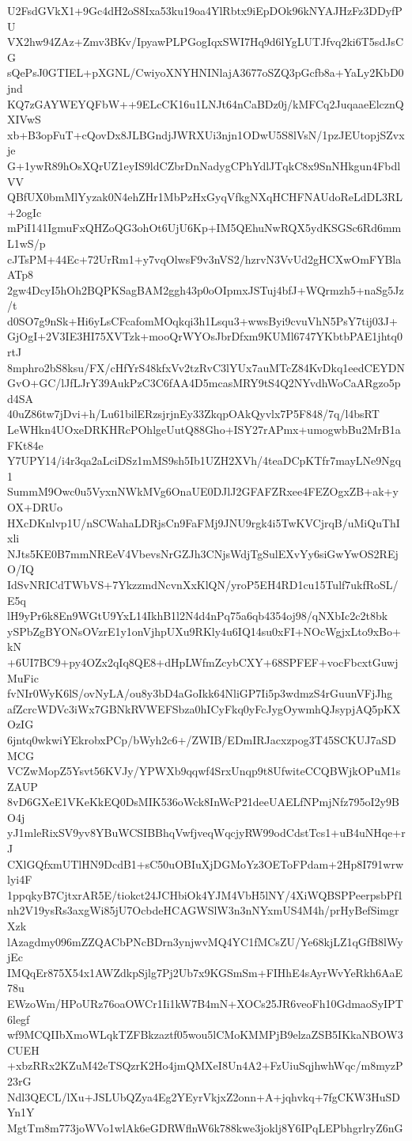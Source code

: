 U2FsdGVkX1+9Gc4dH2oS8Ixa53ku19oa4YlRbtx9iEpDOk96kNYAJHzFz3DDyfPU
VX2hw94ZAz+Zmv3BKv/IpyawPLPGogIqxSWI7Hq9d6lYgLUTJfvq2ki6T5sdJsCG
sQePsJ0GTIEL+pXGNL/CwiyoXNYHNINlajA3677oSZQ3pGcfb8a+YaLy2KbD0jnd
KQ7zGAYWEYQFbW++9ELcCK16u1LNJt64nCaBDz0j/kMFCq2JuqaaeElcznQXIVwS
xb+B3opFuT+cQovDx8JLBGndjJWRXUi3njn1ODwU5S8lVsN/1pzJEUtopjSZvxje
G+1ywR89hOsXQrUZ1eyIS9ldCZbrDnNadygCPhYdlJTqkC8x9SnNHkgun4FbdlVV
QBfUX0bmMlYyzak0N4ehZHr1MbPzHxGyqVfkgNXqHCHFNAUdoReLdDL3RL+2ogIc
mPiI141IgmuFxQHZoQG3ohOt6UjU6Kp+IM5QEhuNwRQX5ydKSGSc6Rd6mmL1wS/p
cJTsPM+44Ec+72UrRm1+y7vqOlwsF9v3nVS2/hzrvN3VvUd2gHCXwOmFYBlaATp8
2gw4DcyI5hOh2BQPKSagBAM2ggh43p0oOIpmxJSTuj4bfJ+WQrmzh5+naSg5Jz/t
d0SO7g9nSk+Hi6yLsCFcafomMOqkqi3h1Lsqu3+wwsByi9cvuVhN5PsY7tij03J+
GjOgI+2V3IE3HI75XVTzk+mooQrWYOsJbrDfxm9KUMl6747YKbtbPAE1jhtq0rtJ
8mphro2bS8ksu/FX/cHfYrS48kfxVv2tzRvC3lYUx7auMTcZ84KvDkq1eedCEYDN
GvO+GC/lJfLJrY39AukPzC3C6fAA4D5mcasMRY9tS4Q2NYvdhWoCaARgzo5pd4SA
40uZ86tw7jDvi+h/Lu61bilERzsjrjnEy33ZkqpOAkQyvlx7P5F848/7q/l4bsRT
LeWHkn4UOxeDRKHRcPOhlgeUutQ88Gho+ISY27rAPmx+umogwbBu2MrB1aFKt84e
Y7UPY14/i4r3qa2aLciDSz1mMS9sh5Ib1UZH2XVh/4teaDCpKTfr7mayLNe9Ngq1
SummM9Owc0u5VyxnNWkMVg6OnaUE0DJlJ2GFAFZRxee4FEZOgxZB+ak+yOX+DRUo
HXcDKnlvp1U/nSCWahaLDRjsCn9FaFMj9JNU9rgk4i5TwKVCjrqB/uMiQuThIxli
NJts5KE0B7mmNREeV4VbevsNrGZJh3CNjsWdjTgSulEXvYy6siGwYwOS2REjO/IQ
IdSvNRICdTWbVS+7YkzzmdNcvnXxKlQN/yroP5EH4RD1cu15Tulf7ukfRoSL/E5q
lH9yPr6k8En9WGtU9YxL14IkhB1l2N4d4nPq75a6qb4354oj98/qNXbIc2c2t8bk
ySPbZgBYONsOVzrE1y1onVjhpUXu9RKly4u6IQ14su0xFI+NOcWgjxLto9xBo+kN
+6UI7BC9+py4OZx2qIq8QE8+dHpLWfmZcybCXY+68SPFEF+vocFbcxtGuwjMuFic
fvNIr0WyK6lS/ovNyLA/ou8y3bD4aGoIkk64NliGP7Ii5p3wdmzS4rGuunVFjJhg
afZcrcWDVc3iWx7GBNkRVWEFSbza0hICyFkq0yFcJygOywmhQJsypjAQ5pKXOzIG
6jntq0wkwiYEkrobxPCp/bWyh2c6+/ZWIB/EDmIRJacxzpog3T45SCKUJ7aSDMCG
VCZwMopZ5Ysvt56KVJy/YPWXb9qqwf4SrxUnqp9t8UfwiteCCQBWjkOPuM1sZAUP
8vD6GXeE1VKeKkEQ0DsMIK536oWck8InWcP21deeUAELfNPmjNfz795oI2y9BO4j
yJ1mleRixSV9yv8YBuWCSIBBhqVwfjveqWqcjyRW99odCdstTcs1+uB4uNHqe+rJ
CXlGQfxmUTlHN9DcdB1+sC50uOBIuXjDGMoYz3OEToFPdam+2Hp8I791wrwlyi4F
1ppqkyB7CjtxrAR5E/tiokct24JCHbiOk4YJM4VbH5lNY/4XiWQBSPPeerpsbPf1
nh2V19ysRs3axgWi85jU7OcbdeHCAGWSlW3n3nNYxmUS4M4h/prHyBefSimgrXzk
lAzagdmy096mZZQACbPNcBDrn3ynjwvMQ4YC1fMCsZU/Ye68kjLZ1qGfB8lWyjEc
IMQqEr875X54x1AWZdkpSjlg7Pj2Ub7x9KGSmSm+FIHhE4sAyrWvYeRkh6AaE78u
EWzoWm/HPoURz76oaOWCr1Ii1kW7B4mN+XOCs25JR6veoFh10GdmaoSyIPT6legf
wf9MCQIIbXmoWLqkTZFBkzaztf05wou5lCMoKMMPjB9elzaZSB5IKkaNBOW3CUEH
+xbzRRx2KZuM42eTSQzrK2Ho4jmQMXeI8Un4A2+FzUiuSqjhwhWqc/m8myzP23rG
Ndl3QECL/lXu+JSLUbQZya4Eg2YEyrVkjxZ2onn+A+jqhvkq+7fgCKW3HuSDYn1Y
MgtTm8m773joWVo1wlAk6eGDRWflnW6k788kwe3joklj8Y6IPqLEPbhgrlryZ6nG
